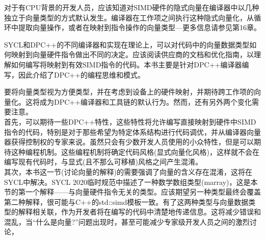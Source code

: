 对于有CPU背景的开发人员，应该知道对SIMD硬件的隐式向量在编译器中以几种独立于向量类型的方式默认发生。编译器在工作项之间执行这种隐式向量化，从循环中提取向量操作，或者在映射到指令操作的向量类型—更多信息请参见第16章。\par

\begin{tcolorbox}[colback=blue!5!white,colframe=blue!75!black, title=其他可能的实现]
SYCL和DPC++的不同编译器和实现在理论上，可以对代码中的向量数据类型如何映射到向量硬件指令做出不同的决定。应该阅读供应商的文档和优化指南，以理解如何编写将映射到有效SIMD指令的代码。本书主要是针对DPC++编译器编写，因此介绍了DPC++的编程思维和模式。
\end{tcolorbox}

\begin{tcolorbox}[colback=blue!5!white,colframe=blue!75!black, title=变化即将发生]
要将向量类型视为方便类型，并在考虑到设备上的硬件映射，并期待跨工作项的向量化。这将成为DPC++编译器和工具链的默认行为。然而，还有另外两个变化需要注意。\\

首先，可以期待一些DPC++特性，这些特性将允许编写直接映射到硬件中SIMD指令的代码，特别是对于那些希望为特定体系结构进行代码调优，并从编译器向量器获得控制权的专家来说。虽然只会有少数开发人员使用的小众特性，但是可以期待这种编程机制。这些编程机制将确定代码风格(显式向量化风格)，这样就不会在编写现有代码时，与显式(且不那么可移植)风格之间产生混淆。\\

其次，本书这一节(讨论向量的解释)的需要强调了向量的含义存在混淆，这将在SYCL中解决。SYCL 2020临时规范中描述了一种数学数组类型(marray)，这是本节的第一个解释——与向量硬件指令无关的类型。应该期望另一种类型最终会覆盖第二种解释，很可能与C++的std::simd模板一致。有了这两种类型与向量数据类型的解释相关联，作为开发者将在编写的代码中清楚地传递信息。这将减少错误和混乱，当“什么是向量?”问题出现时，甚至可能减少专家级开发人员之间的激烈讨论，
\end{tcolorbox}

































